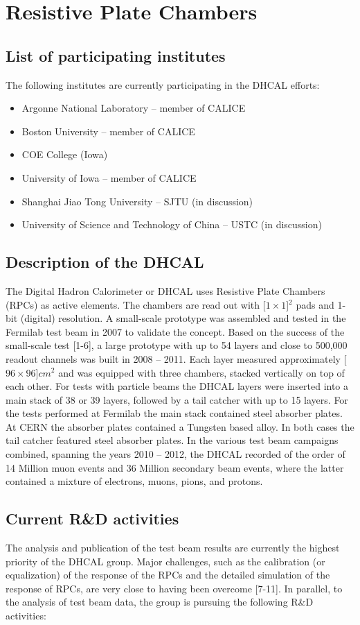 \section{Resistive Plate Chambers}
\subsection{List of participating institutes}
The following institutes are currently participating in the DHCAL efforts:
\begin{itemize}
\item Argonne National Laboratory -- member of CALICE
\item Boston University -- member of CALICE
\item COE College (Iowa)
\item University of Iowa -- member of CALICE
\item Shanghai Jiao Tong University -- SJTU (in discussion)
\item University of Science and Technology of China -- USTC (in discussion)
\end{itemize}

\subsection{Description of the DHCAL}
The Digital Hadron Calorimeter or DHCAL uses Resistive Plate Chambers (RPCs) as active elements. The chambers are read out with \unit[$1 \times 1$]{$^2$} pads and 1-bit (digital) resolution. A small-scale prototype was assembled and tested in the Fermilab test beam in 2007 to validate the concept.
Based on the success of the small-scale test [1-6], a large prototype with up to 54 layers and close to 500,000 readout channels was built in 2008 -- 2011. Each layer measured approximately \unit[$96 \times 96$]{$cm^2$} and was equipped with three chambers, stacked vertically on top of each other. 
For tests with particle beams the DHCAL layers were inserted into a main stack of 38 or 39 layers, followed by a tail catcher with up to 15 layers. For the tests performed at Fermilab the main stack contained steel absorber plates. At CERN the absorber plates contained a Tungsten based alloy. In both cases the tail catcher featured steel absorber plates.
In the various test beam campaigns combined, spanning the years 2010 -- 2012, the DHCAL recorded of the order of 14 Million muon events and 36 Million secondary beam events, where the latter contained a mixture of electrons, muons, pions, and protons. 
\subsection{Current R\&D activities}
The analysis and publication of the test beam results are currently the highest priority of the DHCAL group. Major challenges, such as the calibration (or equalization) of the response of the RPCs and the detailed simulation of the response of RPCs, are very close to having been overcome [7-11]. 
In parallel, to the analysis of test beam data, the group is pursuing the following R\&D activities:
